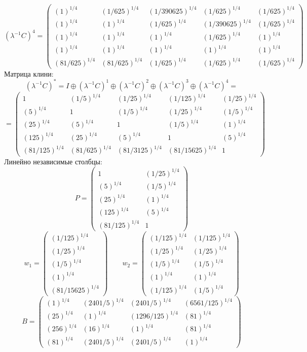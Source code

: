 $$(\lambda^{-1}C)^4 = \begin{pmatrix}
(1)^{1/4} & (1/625)^{1/4} & (1/390625)^{1/4} & (1/625)^{1/4} & (1/625)^{1/4}\\
(1)^{1/4} & (1)^{1/4} & (1/625)^{1/4} & (1/390625)^{1/4} & (1/625)^{1/4}\\
(1)^{1/4} & (1)^{1/4} & (1)^{1/4} & (1/625)^{1/4} & (1)^{1/4}\\
(1)^{1/4} & (1)^{1/4} & (1)^{1/4} & (1)^{1/4} & (1)^{1/4}\\
(81/625)^{1/4} & (81/625)^{1/4} & (1/625)^{1/4} & (1/625)^{1/4} & (1/625)^{1/4}
\end{pmatrix}
$$
Матрица клини:
$$(\lambda^{-1}C)^* = I \oplus (\lambda^{-1}C)^1 \oplus (\lambda^{-1}C)^2 \oplus (\lambda^{-1}C)^3 \oplus (\lambda^{-1}C)^4 = $$
$$ = \begin{pmatrix}
1 & (1/5)^{1/4} & (1/25)^{1/4} & (1/125)^{1/4} & (1/25)^{1/4}\\
(5)^{1/4} & 1 & (1/5)^{1/4} & (1/25)^{1/4} & (1/5)^{1/4}\\
(25)^{1/4} & (5)^{1/4} & 1 & (1/5)^{1/4} & (1)^{1/4}\\
(125)^{1/4} & (25)^{1/4} & (5)^{1/4} & 1 & (5)^{1/4}\\
(81/125)^{1/4} & (81/625)^{1/4} & (81/3125)^{1/4} & (81/15625)^{1/4} & 1
\end{pmatrix}
$$
Линейно независимые столбцы:
$$P = \begin{pmatrix}
1 & (1/25)^{1/4}\\
(5)^{1/4} & (1/5)^{1/4}\\
(25)^{1/4} & (1)^{1/4}\\
(125)^{1/4} & (5)^{1/4}\\
(81/125)^{1/4} & 1
\end{pmatrix}
$$
$$w_1 = \begin{pmatrix}
(1/125)^{1/4}\\
(1/25)^{1/4}\\
(1/5)^{1/4}\\
(1)^{1/4}\\
(81/15625)^{1/4}
\end{pmatrix}
\qquad w_2 = \begin{pmatrix}
(1/125)^{1/4} & (1/125)^{1/4}\\
(1/25)^{1/4} & (1/25)^{1/4}\\
(1/5)^{1/4} & (1/5)^{1/4}\\
(1)^{1/4} & (1)^{1/4}\\
(1/125)^{1/4} & (1/5)^{1/4}
\end{pmatrix}
$$
$$B = \begin{pmatrix}
(1)^{1/4} & (2401/5)^{1/4} & (2401/5)^{1/4} & (6561/125)^{1/4}\\
(25)^{1/4} & (1)^{1/4} & (1296/125)^{1/4} & (81)^{1/4}\\
(256)^{1/4} & (16)^{1/4} & (1)^{1/4} & (81)^{1/4}\\
(81)^{1/4} & (2401/5)^{1/4} & (2401/5)^{1/4} & (1)^{1/4}
\end{pmatrix}
$$
